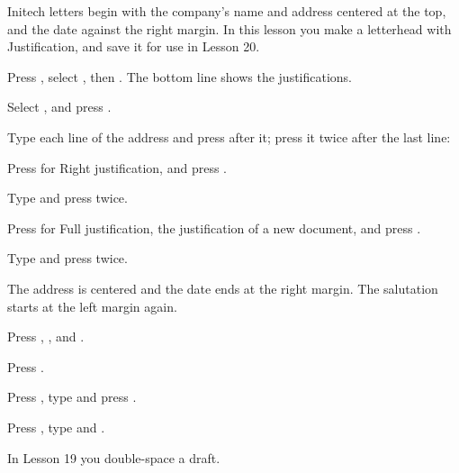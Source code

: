 Initech letters begin with the company's name and address centered at the
top, and the date against the right margin.  In this lesson you make a
letterhead with Justification, and save it for use in Lesson 20.

\begin{WPSteps}
\item Press , select , then
.  The bottom line shows the justifications.
\item Select , and press .
\item Type each line of the address and press  after it; press it
twice after the last line:
\end{WPSteps}

\begin{WPSteps}
\item Press  for Right justification, and press
.
\item Type  and press  twice.
\end{WPSteps}

\begin{WPSteps}
\item Press  for Full justification, the
justification of a new document, and press .
\item Type  and press 
twice.
\end{WPSteps}
The address is centered and the date ends at the right margin.  The
salutation starts at the left margin again.

\begin{WPSteps}
\item Press , ,  and
.
\end{WPSteps}

\begin{WPSteps}
\item Press .
\item Press , type  and press
.
\item Press , type  and .
\end{WPSteps}
\EndReplay
In Lesson 19 you double-space a draft.
